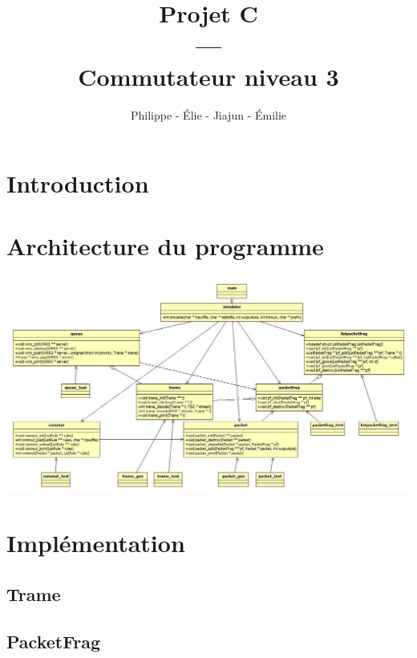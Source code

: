 \documentclass{beamer}
\title{Projet C\\---\\Commutateur niveau 3}
\author{Philippe \bsc{Tran Ba} - Élie \bsc{Bouttier} - Jiajun \bsc{Shi} - Émilie \bsc{Abia}}
\institute{ENSEEIHT, département TR}
\newcommand{\FSource}[1]{%
  
  }
\begin{document}
\begin{frame}
\titlepage
\end{frame}

\begin{frame}
\tableofcontents
\end{frame}

\section{Introduction}

\section{Architecture du programme}

\begin{frame}
\hspace{-1cm}\includegraphics[scale=0.28]{UML2.jpg}
\end{frame}


\section{Implémentation}

\subsection{Trame}

\frame{\FSource{sources/trame.h}}

\frame{\FSource{sources/automate.c}}

\subsection{PacketFrag}
\end{document}
